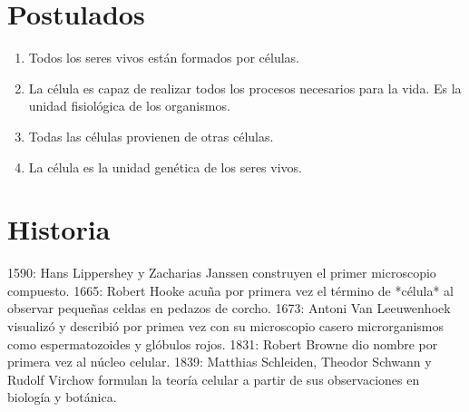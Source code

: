 \section{Postulados}

\begin{enumerate}
    \item Todos los seres vivos están formados por células. 
    \item La célula es capaz de realizar todos los procesos necesarios para la vida. Es la unidad fisiológica de los organismos.
    \item Todas las células provienen de otras células.
    \item La célula es la unidad genética de los seres vivos.
\end{enumerate}

\section{Historia}

1590: Hans Lippershey y Zacharias Janssen construyen el primer microscopio compuesto.
1665: Robert Hooke acuña por primera vez el término de *célula* al observar pequeñas celdas en pedazos de corcho.
1673: Antoni Van Leeuwenhoek visualizó y describió por primea vez con su microscopio casero microrganismos como espermatozoides y glóbulos rojos.
1831: Robert Browne dio nombre por primera vez al núcleo celular.
1839: Matthias Schleiden, Theodor Schwann y Rudolf Virchow formulan la teoría celular a partir de sus observaciones en biología y botánica.